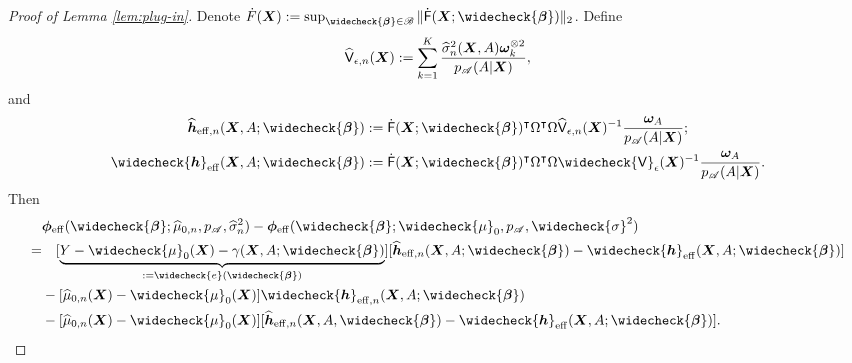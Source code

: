 \documentclass[11pt]{article}
\numberwithin{equation}{section}
\theoremstyle{definition}
\theoremstyle{remark}
\newcommand{\bh}{\bm{h}}
\newcommand{\bX}{\bm{X}}
\newcommand{\bbeta}{\bm{\beta}}
\newcommand{\bomega}{\bm{\omega}}
\newcommand{\bphi}{\bm{\phi}}
\newcommand{\sA}{\mathscr{A}}
\newcommand{\sB}{\mathscr{B}}
\newcommand{\sfF}{\mathsf{F}}
\newcommand{\sfV}{\mathsf{V}}
\newcommand{\eff}{\mathrm{eff}}
\begin{document}
\begin{proof}[Proof of Lemma \ref{lem:plug-in}]
	Denote $ \dot{F}(\bX) := \sup_{\widecheck{\bbeta} \in \sB}\|\dot{\sfF}(\bX;\widecheck{\bbeta})\|_{2} $. Define
	\[ \widehat{\sfV}_{\epsilon,n}(\bX) := \sum_{k=1}^{K}{\widehat{\sigma}_{n}^{2}(\bX,A)\bomega_{k}^{\otimes 2} \over p_{\sA}(A|\bX)}, \]
	and
	\begin{align*}
		\widehat{\bh}_{\eff,n}(\bX,A;\widecheck{\bbeta}) &:= \dot{\sfF}(\bX;\widecheck{\bbeta})^{\intercal}\Omega^{\intercal}\Omega\widehat{\sfV}_{\epsilon,n}(\bX)^{-1}{\bomega_{A} \over p_{\sA}(A|\bX)};\\
		\widecheck{\bh}_{\eff}(\bX,A;\widecheck{\bbeta}) &:= \dot{\sfF}(\bX;\widecheck{\bbeta})^{\intercal}\Omega^{\intercal}\Omega\widecheck{\sfV}_{\epsilon}(\bX)^{-1}{\bomega_{A} \over p_{\sA}(A|\bX)}.
	\end{align*}
	Then
	\begin{align}
		&\bphi_{\eff}(\widecheck{\bbeta};\widehat{\mu}_{0,n},p_{\sA},\widehat{\sigma}_{n}^{2}) - \bphi_{\eff}(\widecheck{\bbeta};\widecheck{\mu}_{0},p_{\sA},\widecheck{\sigma}^{2}) \nonumber \\
		=& \quad [\underbrace{Y - \widecheck{\mu}_{0}(\bX) - \gamma(\bX,A;\widecheck{\bbeta})}_{:= \widecheck{e}(\widecheck{\bbeta})}][\widehat{\bh}_{\eff,n}(\bX,A;\widecheck{\bbeta}) - \widecheck{\bh}_{\eff}(\bX,A;\widecheck{\bbeta})] \label{eq:plug-in-1} \\
		& - [\widehat{\mu}_{0,n}(\bX) - \widecheck{\mu}_{0}(\bX)]\widecheck{\bh}_{\eff,n}(\bX,A;\widecheck{\bbeta}) \label{eq:plug-in-2}\\
		& - [\widehat{\mu}_{0,n}(\bX) - \widecheck{\mu}_{0}(\bX)][\widehat{\bh}_{\eff,n}(\bX,A,\widecheck{\bbeta}) - \widecheck{\bh}_{\eff}(\bX,A;\widecheck{\bbeta})]. \label{eq:plug-in-3}
	\end{align}
	

\end{proof}
\end{document}

